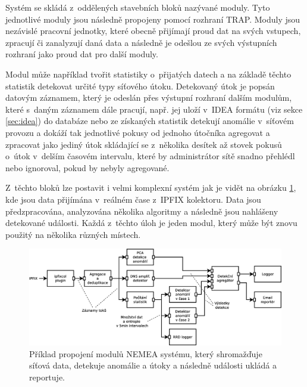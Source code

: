 Systém se skládá z~oddělených stavebních bloků nazývané moduly. Tyto jednotlivé moduly jsou následně propojeny pomocí rozhraní TRAP. Moduly jsou nezávislé pracovní jednotky, které obecně přijímají proud dat na svých vstupech, zpracují či zanalyzují daná data a následně je odešlou ze svých výstupních rozhraní jako proud dat pro další moduly. 

Modul může například tvořit statistiky o~přijatých datech a na základě těchto statistik detekovat určité typy síťového útoku. Detekovaný útok je popsán datovým záznamem, který je odeslán přes výstupní rozhraní dalším modulům, které s~daným záznamem dále pracují, např. jej uloží v~IDEA formátu (viz sekce \ref{sec:idea}) do databáze nebo ze získaných statistik detekují anomálie v~síťovém provozu a dokáží tak jednotlivé pokusy od jednoho útočníka agregovat a zpracovat jako jediný útok skládající se z~několika desítek až stovek pokusů o~útok v~delším časovém intervalu, které by administrátor sítě snadno přehlédl nebo ignoroval, pokud by nebyly agregované.

Z~těchto bloků lze postavit i velmi komplexní systém jak je vidět na obrázku \ref{fig:nemea-example-2}, kde jsou data přijímána v~reálném čase z~IPFIX\cite{ipfix} kolektoru. Data jsou předzpracována, analyzována několika algoritmy a následně jsou nahlášeny detekované události. Každá z~těchto úloh je jeden modul, který může být znovu použitý na několika různých místech.

\begin{figure}[h]
    \centering
    \includegraphics[width=1\textwidth]{fig/nemea-example-2-cz.eps}
    \caption{Příklad propojení modulů NEMEA systému, který shromažďuje síťová data, detekuje anomálie a útoky a následně události ukládá a reportuje.} \label{fig:nemea-example-2}
  
\end{figure}



